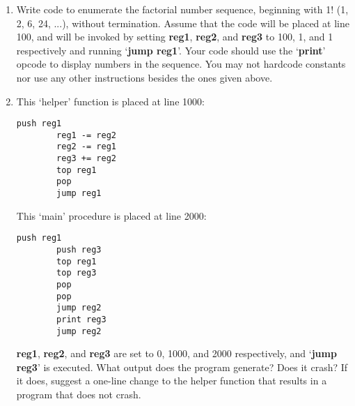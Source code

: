 \documentclass[11pt]{article}
\begin{document}
\begin{enumerate}
  \begin{enumerate}
      \item Write code to enumerate the factorial number sequence, beginning with 1! (1, 2, 6, 24, ...), without termination. Assume that the code will be placed at line 100, and will be invoked by setting \textbf{reg1}, \textbf{reg2}, and \textbf{reg3} to 100, 1, and 1 respectively and running ‘\textbf{jump reg1}’. Your code should use the ‘\textbf{print}’ opcode to display numbers in the sequence. You may not hardcode constants nor use any other instructions besides the ones given above.
      \item This ‘helper’ function is placed at line 1000:
      \begin{lstlisting}[firstnumber=1000]
        push reg1
        reg1 -= reg2
        reg2 -= reg1
        reg3 += reg2
        top reg1
        pop
        jump reg1
      \end{lstlisting}
      This ‘main’ procedure is placed at line 2000:
      \begin{lstlisting}[firstnumber=2000]
        push reg1
        push reg3
        top reg1
        top reg3
        pop
        pop
        jump reg2
        print reg3
        jump reg2
      \end{lstlisting}
      \textbf{reg1}, \textbf{reg2}, and \textbf{reg3} are set to 0, 1000, and 2000 respectively, and ‘\textbf{jump reg3}’ is executed. What output does the program generate? Does it crash? If it does, suggest a one-line change to the helper function that results in a program that does not crash.
  \end{enumerate}

  
  
\end{enumerate}   
\end{document}
